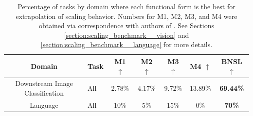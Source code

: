 \documentclass{article} %
\newcommand{\highlight}[1]{\colorbox{blue!10}{#1}}
\begin{document}
\begin{table}[hbt!]
    \centering
    \begin{tabular}{ |cH|c|c|c|c|c| } 
\hline
Domain & \hspace{.9cm}Task & M1 $\uparrow$ & M2 $\uparrow$ & M3 $\uparrow$ & M4 $\uparrow$ & BNSL $\uparrow$ \\
 \hline
 
Downstream Image Classification & All & 2.78\% & 4.17\% & 9.72\% & 13.89\% & \bfseries 69.44\%\\
 Language & All & 10\% & 5\% & 15\% & 0\% & \bfseries 70\%\\
 \hline
\end{tabular}
\vspace{-1.1mm}
    \caption{
    Percentage of tasks by domain where each functional form is the best for extrapolation of scaling behavior. Numbers for M1, M2, M3, and M4 were obtained via correspondence with authors of \cite{Alabdulmohsi2022revisiting}. See Sections \ref{section:scaling_benchmark__vision} and \ref{section:scaling_benchmark__language} for more details.
    }
    \label{table:scaling_laws_benchmark_dataset__summary}
\end{table}
\end{document}
